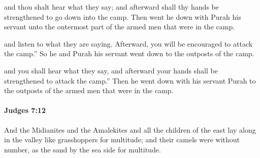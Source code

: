 			\begin{versebox}
					\item[BHS] 
					\item[ASV] and thou shalt hear what they say; and afterward shall thy hands be strengthened to go down into the camp. Then went he down with Purah his servant unto the outermost part of the armed men that were in the camp.
					\item[NIV] and listen to what they are saying. Afterward, you will be encouraged to attack the camp.” So he and Purah his servant went down to the outposts of the camp.
					\item[NRSV] and you shall hear what they say, and afterward your hands shall be strengthened to attack the camp.” Then he went down with his servant Purah to the outposts of the armed men that were in the camp.
			\end{versebox}

		\paragraph{Judges 7:12} %
			\label{JUDGES-7-12}

			And the Midianites and the Amalekites and all the children of the east lay along in the valley like grasshoppers for multitude; and their camels were without number, as the sand by the sea side for multitude.

